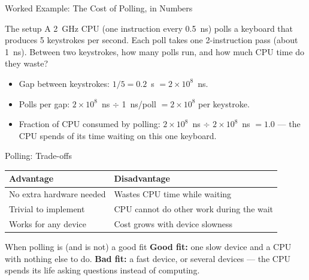 \documentclass[aspectratio=169]{beamer}
\begin{document}
\begin{frame}{Worked Example: The Cost of Polling, in Numbers}
  \begin{block}{The setup}
    A 2~GHz CPU (one instruction every 0.5~ns) polls a keyboard that produces
    5 keystrokes per second. Each poll takes one 2-instruction pass
    (about 1~ns). Between two keystrokes, how many polls run, and how much
    CPU time do they waste?
  \end{block}
  \begin{itemize}
    \item Gap between keystrokes: $1/5 = 0.2$~s $= 2\times10^8$~ns.
    \item Polls per gap: $2\times10^8$~ns $\div$ 1~ns/poll
      $= 2\times10^8$  per keystroke.
    \item Fraction of CPU consumed by polling: $2\times10^8$~ns $\div$
      $2\times10^8$~ns $= 1.0$ --- the CPU spends  of its time
      waiting on this one keyboard.
  \end{itemize}
\end{frame}

\begin{frame}{Polling: Trade-offs}
  \begin{tabular}{@{}ll@{}}
    \toprule
    \textbf{Advantage} & \textbf{Disadvantage} \\
    \midrule
    No extra hardware needed & Wastes CPU time while waiting \\
    Trivial to implement & CPU cannot do other work during the wait \\
    Works for any device & Cost grows with device slowness \\
    \bottomrule
  \end{tabular}
  \vspace{0.3cm}
  \begin{block}{When polling is (and is not) a good fit}
    \textbf{Good fit:} one slow device and a CPU with nothing else to do.
    \textbf{Bad fit:} a fast device, or several devices --- the CPU spends
    its life asking questions instead of computing.
  \end{block}
\end{frame}


\end{document}
